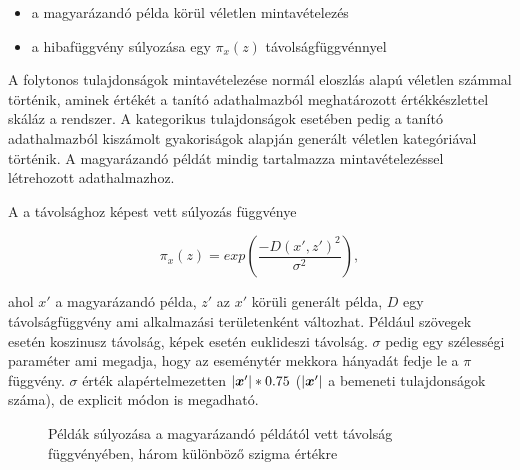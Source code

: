 \begin{itemize}
	\item a magyarázandó példa körül véletlen mintavételezés
	\item a hibafüggvény súlyozása egy $\pi_x (z)$ távolságfüggvénnyel
\end{itemize}

A folytonos tulajdonságok mintavételezése normál eloszlás alapú véletlen számmal történik, aminek értékét a tanító adathalmazból meghatározott értékkészlettel skáláz a rendszer. A kategorikus tulajdonságok esetében pedig a tanító adathalmazból kiszámolt gyakoriságok alapján generált véletlen kategóriával történik. A magyarázandó példát mindig tartalmazza mintavételezéssel létrehozott adathalmazhoz.

A a távolsághoz képest vett súlyozás függvénye

\begin{equation}
    \pi_x (z) = exp\left(\frac{-D(x',z')^2}{\sigma^2}\right),
\end{equation}

ahol $x'$ a magyarázandó példa, $z'$ az $x'$ körüli generált példa, $D$ egy távolságfüggvény ami alkalmazási területenként változhat. Például szövegek esetén koszinusz távolság, képek esetén euklideszi távolság. $\sigma$ pedig egy szélességi paraméter ami megadja, hogy az eseménytér mekkora hányadát fedje le a $\pi$ függvény. $\sigma$ érték alapértelmezetten $|\boldsymbol x'|*0.75$ ($|\boldsymbol x'|$ a bemeneti tulajdonságok száma), de explicit módon is megadható.

\begin{figure}[H]
    \centering
	\caption{Példák súlyozása a magyarázandó példától vett távolság függvényében, három különböző szigma értékre}
\end{figure}

